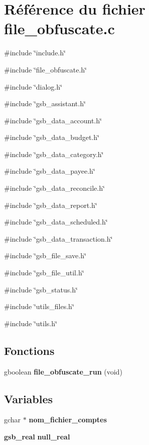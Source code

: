 \section{Référence du fichier file\_\-obfuscate.c}
\label{file__obfuscate_8c}
{\ttfamily \#include \char`\"{}include.h\char`\"{}}\par
{\ttfamily \#include \char`\"{}file\_\-obfuscate.h\char`\"{}}\par
{\ttfamily \#include \char`\"{}dialog.h\char`\"{}}\par
{\ttfamily \#include \char`\"{}gsb\_\-assistant.h\char`\"{}}\par
{\ttfamily \#include \char`\"{}gsb\_\-data\_\-account.h\char`\"{}}\par
{\ttfamily \#include \char`\"{}gsb\_\-data\_\-budget.h\char`\"{}}\par
{\ttfamily \#include \char`\"{}gsb\_\-data\_\-category.h\char`\"{}}\par
{\ttfamily \#include \char`\"{}gsb\_\-data\_\-payee.h\char`\"{}}\par
{\ttfamily \#include \char`\"{}gsb\_\-data\_\-reconcile.h\char`\"{}}\par
{\ttfamily \#include \char`\"{}gsb\_\-data\_\-report.h\char`\"{}}\par
{\ttfamily \#include \char`\"{}gsb\_\-data\_\-scheduled.h\char`\"{}}\par
{\ttfamily \#include \char`\"{}gsb\_\-data\_\-transaction.h\char`\"{}}\par
{\ttfamily \#include \char`\"{}gsb\_\-file\_\-save.h\char`\"{}}\par
{\ttfamily \#include \char`\"{}gsb\_\-file\_\-util.h\char`\"{}}\par
{\ttfamily \#include \char`\"{}gsb\_\-status.h\char`\"{}}\par
{\ttfamily \#include \char`\"{}utils\_\-files.h\char`\"{}}\par
{\ttfamily \#include \char`\"{}utils.h\char`\"{}}\par
\subsection*{Fonctions}
\begin{DoxyCompactItemize}
\item 
gboolean {\bf file\_\-obfuscate\_\-run} (void)
\end{DoxyCompactItemize}
\subsection*{Variables}
\begin{DoxyCompactItemize}
\item 
gchar $\ast$ {\bf nom\_\-fichier\_\-comptes}
\item 
{\bf gsb\_\-real} {\bf null\_\-real}
\end{DoxyCompactItemize}


